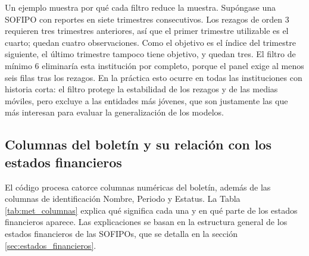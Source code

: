 
Un ejemplo muestra por qué cada filtro reduce la muestra. Supóngase una SOFIPO con reportes en siete trimestres consecutivos. Los rezagos de orden 3 requieren tres trimestres anteriores, así que el primer trimestre utilizable es el cuarto; quedan cuatro observaciones. Como el objetivo es el índice del trimestre siguiente, el último trimestre tampoco tiene objetivo, y quedan tres. El filtro de mínimo 6 eliminaría esta institución por completo, porque el panel exige al menos seis filas tras los rezagos. En la práctica esto ocurre en todas las instituciones con historia corta: el filtro protege la estabilidad de los rezagos y de las medias móviles, pero excluye a las entidades más jóvenes, que son justamente las que más interesan para evaluar la generalización de los modelos.

\subsection{Columnas del boletín y su relación con los estados financieros}
El código procesa catorce columnas numéricas del boletín, además de las columnas de identificación Nombre, Periodo y Estatus. La Tabla \ref{tab:met_columnas} explica qué significa cada una y en qué parte de los estados financieros aparece. Las explicaciones se basan en la estructura general de los estados financieros de las SOFIPOs, que se detalla en la sección \ref{sec:estados_financieros}.

